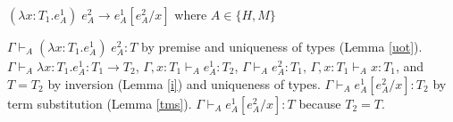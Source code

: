 \begin{case}
$(\lambda x:T_{1}.e_{A}^{1})\;e_{A}^{2}\rightarrow e_{A}^{1}[e_{A}^{2}/x]$ where $A\in\lbrace H,M\rbrace$

$\Gamma\vdash_{A}(\lambda x:T_{1}.e_{A}^{1})\;e_{A}^{2}:T$ by premise and uniqueness of types (Lemma \ref{uot}).  $\Gamma\vdash_{A}\lambda x:T_{1}.e_{A}^{1}:T_{1}\rightarrow T_{2}$, $\Gamma,x:T_{1}\vdash_{A}e_{A}^{1}:T_{2}$, $\Gamma\vdash_{A}e_{A}^{2}:T_{1}$, $\Gamma,x:T_{1}\vdash_{A}x:T_{1}$, and $T=T_{2}$ by inversion (Lemma \ref{i}) and uniqueness of types.  $\Gamma\vdash_{A}e_{A}^{1}[e_{A}^{2}/x]:T_{2}$ by term substitution (Lemma \ref{tms}).  $\Gamma\vdash_{A}e_{A}^{1}[e_{A}^{2}/x]:T$ because $T_{2}=T$.
\end{case}